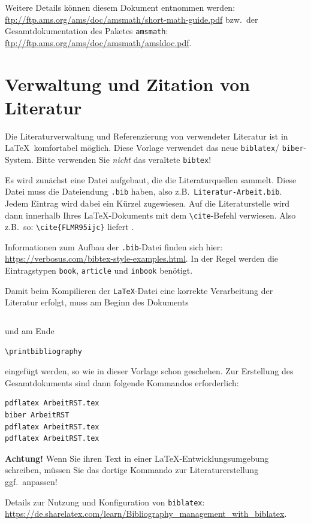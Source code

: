 \documentclass[arbeit=studie,oneside,BCOR=12mm]{ArbeitRST}
\begin{document}
Weitere Details können diesem Dokument entnommen werden: \url{ftp://ftp.ams.org/ams/doc/amsmath/short-math-guide.pdf} bzw.~der Gesamtdokumentation des Paketes \texttt{amsmath}: \url{ftp://ftp.ams.org/ams/doc/amsmath/amsldoc.pdf}.


\chapter{Verwaltung und Zitation von Literatur}
Die Literaturverwaltung und Referenzierung von verwendeter Literatur ist in \LaTeX~komfortabel möglich. Diese Vorlage verwendet das neue \texttt{biblatex}/ \texttt{biber}-System. Bitte verwenden Sie \emph{nicht} das veraltete \texttt{bibtex}!

Es wird zunächst eine Datei aufgebaut, die die Literaturquellen sammelt. Diese Datei muss die Dateiendung \texttt{.bib} haben, also z.B.~\texttt{Literatur-Arbeit.bib}. Jedem Eintrag wird dabei ein Kürzel zugewiesen. Auf die Literaturstelle wird dann innerhalb Ihres \LaTeX-Dokuments mit dem \texttt{\textbackslash cite}-Befehl verwiesen. Also z.B.~so: \texttt{\textbackslash cite\{FLMR95ijc\}} liefert \cite{FLMR95ijc}.

Informationen zum Aufbau der \texttt{.bib}-Datei finden sich hier: \url{https://verbosus.com/bibtex-style-examples.html}. In der Regel werden die Eintragstypen \texttt{book}, \texttt{article} und \texttt{inbook} benötigt.

Damit beim Kompilieren der \texttt{LaTeX}-Datei eine korrekte Verarbeitung der Literatur erfolgt, muss am Beginn des Dokuments
\begin{verbatim}

\end{verbatim}
und am Ende
\begin{verbatim}
\printbibliography
\end{verbatim}
eingefügt werden, so wie in dieser Vorlage schon geschehen. Zur Erstellung des Gesamtdokuments sind dann folgende Kommandos erforderlich:
\begin{verbatim}
pdflatex ArbeitRST.tex
biber ArbeitRST
pdflatex ArbeitRST.tex
pdflatex ArbeitRST.tex
\end{verbatim}

\textbf{Achtung!} Wenn Sie ihren Text in einer \LaTeX -Entwicklungsumgebung schreiben, müssen Sie das dortige Kommando zur Literaturerstellung ggf.~anpassen!

Details zur Nutzung und Konfiguration von \texttt{biblatex}: \url{https://de.sharelatex.com/learn/Bibliography_management_with_biblatex}.
\end{document}
